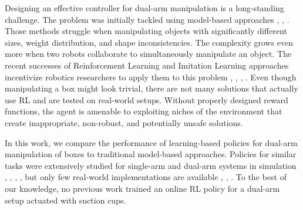 \documentclass[letterpaper, 10 pt, conference]{ieeeconf}  %
\begin{document}
Designing an effective controller for dual-arm manipulation is a long-standing challenge. The problem was initially tackled using model-based approaches \cite{KRUGER20115}, \cite{10322775}, \cite{doi:10.1177/0278364918765952}. Those methods struggle when manipulating objects with significantly different sizes, weight distribution, and shape inconsistencies. The complexity grows even more when two robots collaborate to simultaneously manipulate an object. 
The recent successes of Reinforcement Learning and Imitation Learning approaches incentivize robotics researchers to apply them to this problem \cite{lin2023bitouchbimanualtactilemanipulation}, \cite{kataoka2022bimanualmanipulationattachmentsimtoreal}, \cite{drolet2024comparisonimitationlearningalgorithms}, \cite{luo2024precisedexterousroboticmanipulation}.
Even though manipulating a box might look trivial, there are not many solutions that actually use RL and are tested on real-world setups. Without properly designed reward functions, the agent is amenable to exploiting niches of the environment that create inappropriate, non-robust, and potentially unsafe solutions.

In this work, we compare the performance of learning-based policies for dual-arm manipulation of boxes to traditional model-based approaches. 
Policies for similar tasks were extensively studied for single-arm and dual-arm systems in simulation \cite{nair2018overcomingexplorationreinforcementlearning}, \cite{huang2024mrhermodelbasedrelayhindsight}, \cite{makarova2025contherhumanlikecontextualrobot}, \cite{Horv_th_2024}, but only few real-world implementations are available \cite{wang2025oneshotdualarmimitationlearning}, \cite{mu2025robotwindualarmrobotbenchmark}, \cite{wang2025learningdualarmcoordinationgrasping}. To the best of our knowledge, no previous work trained an online RL policy for a dual-arm setup actuated with suction cups.
\end{document}
